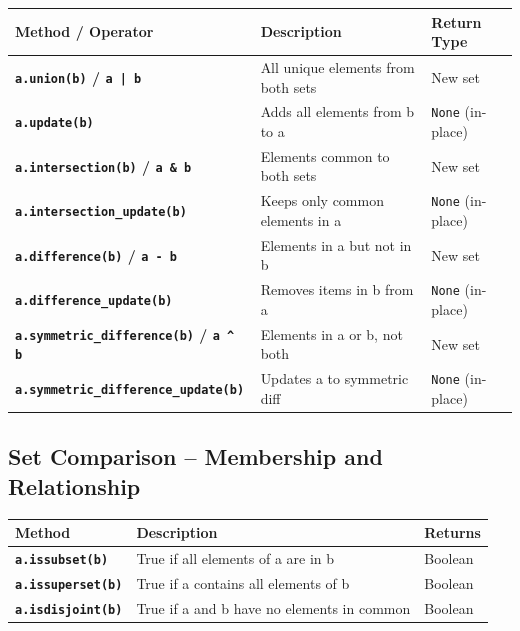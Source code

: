 \documentclass[a4paper,11pt]{article}
\begin{document}
	\begin{tabular}{>{\bfseries}p{4cm} p{6.5cm} p{3cm}}
		\toprule
		Method / Operator & Description & Return Type \\
		\midrule
		
		\texttt{a.union(b)} / \texttt{a | b} & All unique elements from both sets & New set \\
		\texttt{a.update(b)} & Adds all elements from b to a & \texttt{None} (in-place) \\
		
		\texttt{a.intersection(b)} / \texttt{a \& b} & Elements common to both sets & New set \\
		\texttt{a.intersection\_update(b)} & Keeps only common elements in a & \texttt{None} (in-place) \\
		
		\texttt{a.difference(b)} / \texttt{a - b} & Elements in a but not in b & New set \\
		\texttt{a.difference\_update(b)} & Removes items in b from a & \texttt{None} (in-place) \\
		
		\texttt{a.symmetric\_difference(b)} / \texttt{a \textasciicircum{} b} & Elements in a or b, not both & New set \\
		\texttt{a.symmetric\_difference\_update(b)} & Updates a to symmetric diff & \texttt{None} (in-place) \\
		
		\bottomrule
	\end{tabular}

\vspace{1em}
\subsection*{Set Comparison – Membership and Relationship}

\begin{tabular}{>{\bfseries}p{4.5cm} p{7.2cm} p{2cm}}
	\toprule
	Method & Description & Returns \\
	\midrule
	
	\texttt{a.issubset(b)}     & True if all elements of a are in b     & Boolean \\
	\texttt{a.issuperset(b)}   & True if a contains all elements of b   & Boolean \\
	\texttt{a.isdisjoint(b)}   & True if a and b have no elements in common & Boolean \\
	
	\bottomrule
\end{tabular}
\end{document}
